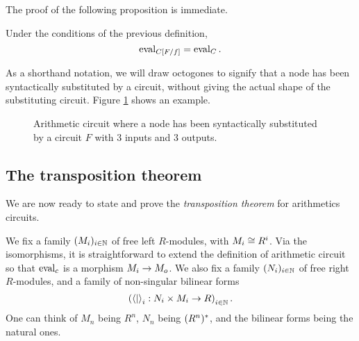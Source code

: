 The proof of the following proposition is immediate.

\begin{proposition}
  Under the conditions of the previous definition,
  \[\operatorname{eval}_{C[F/f]} = \operatorname{eval}_C \text{.}\]
\end{proposition}

As a shorthand notation, we will draw octogones to signify that a node
has been syntactically substituted by a circuit, without giving the
actual shape of the substituting circuit. Figure
\ref{fig:substitution} shows an example.

\begin{figure}[!ht]
  \label{fig:substitution}
  \centering
  \caption{Arithmetic circuit where a node has been syntactically
    substituted by a circuit $F$ with $3$ inputs and $3$ outputs.}
\end{figure}



\subsection{The transposition theorem}
\label{sec:tellegen}
We are now ready to state and prove the
\emph{transposition theorem} for
arithmetics circuits. 

We fix a family $(M_i)_{i\in\mathbb{N}}$ of free left $R$-modules, with
$M_i\cong R^i$. Via the isomorphisms, it is straightforward to extend
the definition of arithmetic circuit so that $\operatorname{eval}_c$ is a morphism
$M_i\rightarrow M_o$.  We also fix a family $(N_i)_{i\in\mathbb{N}}$ of free right
$R$-modules, and a family of non-singular bilinear forms
\begin{equation}
  \label{eq:240}
  \left(\left\langle  \middle|  \right\rangle_i:N_i\times M_i\rightarrow R\right)_{i\in\mathbb{N}}
  \text{.}
\end{equation}
One can think of $M_n$ being $R^n$, $N_n$ being $(R^n)^\ast$, and
the bilinear forms being the natural ones.

